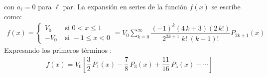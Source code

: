 con $a_{\ell} = 0$ para $\ell$ par. La expansión en series de la función $f(x)$ se escribe como:
\begin{align*}
f(x) = \begin{cases}
V_{0} & \mbox{ si } 0 < x \leq 1 \\[0.5em]
-V_{0} & \mbox{ si } -1 \leq x < 0
\end{cases}
= V_{0} \sum_{k=0}^{\infty} \dfrac{(-1)^{k}(4 \, k + 3)(2 \, k!)}{2^{2k+1} \; k! \; (k+1)!} P_{2k+1} (x)
\end{align*}
Expresando los primeros términos :
\begin{align*}
f(x) = V_{0} \left[ \dfrac{3}{2} \, P_{1}(x) - \dfrac{7}{8} \, P_{3}(x) + \dfrac{11}{16} \, P_{5}(x) - \cdots \right]
\end{align*}
